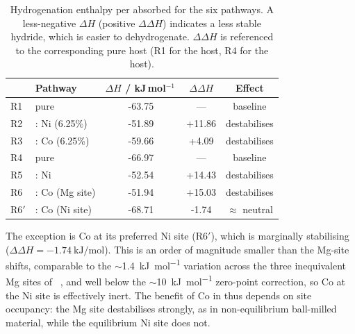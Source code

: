\documentclass[11pt,a4paper]{article}
\begin{document}
\begin{table}[h!]
\centering
{}
\begin{tabular}{l l S[table-format=-3.2] S[table-format=+2.2] c}
\toprule
& Pathway & {$\Delta H$ / kJ\,mol$^{-1}$\,} & {$\Delta\Delta H$} & Effect \\
\midrule
R1   & pure               & -63.75 & {---}  & baseline \\
R2   &  : Ni (6.25\%)     & -51.89 & +11.86 & destabilises \\
R3   &  : Co (6.25\%)     & -59.66 &  +4.09 & destabilises \\
\midrule
R4   & pure            & -66.97 & {---}  & baseline \\
R5   &  : Ni           & -52.54 & +14.43 & destabilises \\
R6   &  : Co (Mg site) & -51.94 & +15.03 & destabilises \\
R6$'$&  : Co (Ni site) & -68.71 &  -1.74 & $\approx$ neutral \\
\bottomrule
\end{tabular}
\caption{Hydrogenation enthalpy per absorbed  for the six pathways. A
less-negative $\Delta H$ (positive $\Delta\Delta H$) indicates a less stable
hydride, which is easier to dehydrogenate. $\Delta\Delta H$ is referenced to
the corresponding pure host (R1 for the  host, R4 for the 
host).}
\label{tab:nicodop:dH}
\end{table}

The exception is Co at its preferred Ni site (R6$'$), which is marginally
stabilising ($\Delta\Delta H = \SI{-1.74}{\kilo\joule\per\mol}$). This is an
order of magnitude smaller than the Mg-site shifts, comparable to the
$\sim$\SI{1.4}{\kilo\joule\per\mol} variation across the three inequivalent
Mg sites of ~\cite{yoon2024}, and well below the
$\sim$\SI{10}{\kilo\joule\per\mol} zero-point correction, so Co at the Ni
site is effectively inert. The benefit of Co in  thus depends on
site occupancy: the Mg site destabilises strongly, as in non-equilibrium
ball-milled material, while the equilibrium Ni site does not.
\end{document}
